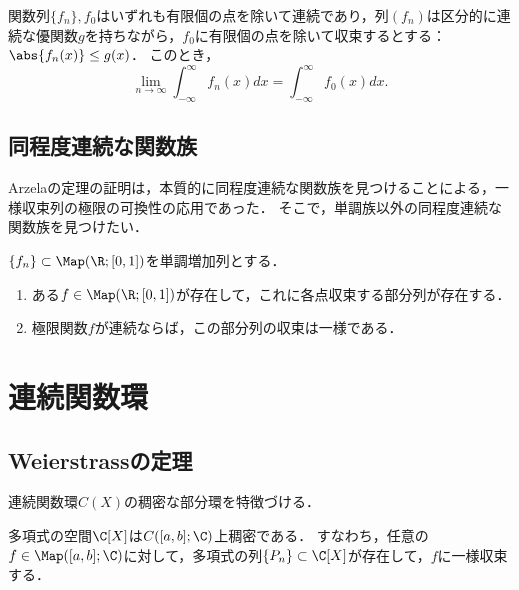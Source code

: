 \documentclass[uplatex, dvipdfmx]{jsreport}
\begin{document}
\begin{corollary}
    関数列$\{f_n\},f_0$はいずれも有限個の点を除いて連続であり，列$(f_n)$は区分的に連続な優関数$g$を持ちながら，$f_0$に有限個の点を除いて収束するとする：$\abs{f_n(x)}\le g(x)$．
    このとき，
    \[\lim_{n\to\infty}\int^\infty_{-\infty}f_n(x)dx=\int^\infty_{-\infty}f_0(x)dx.\]
\end{corollary}

\subsection{同程度連続な関数族}

\begin{tcolorbox}[colframe=ForestGreen, colback=ForestGreen!10!white,breakable,colbacktitle=ForestGreen!40!white,coltitle=black,fonttitle=\bfseries\sffamily,
title=]
    Arzelaの定理の証明は，本質的に同程度連続な関数族を見つけることによる，一様収束列の極限の可換性の応用であった．
    そこで，単調族以外の同程度連続な関数族を見つけたい．
\end{tcolorbox}

\begin{theorem}
    $\{f_n\}\subset\Map(\R;[0,1])$を単調増加列とする．
    \begin{enumerate}
        \item ある$f\in\Map(\R;[0,1])$が存在して，これに各点収束する部分列が存在する．
        \item 極限関数$f$が連続ならば，この部分列の収束は一様である．
    \end{enumerate}
\end{theorem}

\section{連続関数環}

\subsection{Weierstrassの定理}

\begin{tcolorbox}[colframe=ForestGreen, colback=ForestGreen!10!white,breakable,colbacktitle=ForestGreen!40!white,coltitle=black,fonttitle=\bfseries\sffamily,
title=]
    連続関数環$C(X)$の稠密な部分環を特徴づける．
\end{tcolorbox}

\begin{theorem}
    多項式の空間$\C[X]$は$C([a,b];\C)$上稠密である．
    すなわち，任意の$f\in\Map([a,b];\C)$に対して，多項式の列$\{P_n\}\subset\C[X]$が存在して，$f$に一様収束する．
\end{theorem}
\end{document}
